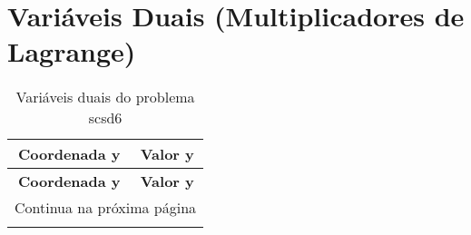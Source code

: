 \documentclass[12pt]{article}
\begin{document}
\section{Variáveis Duais (Multiplicadores de Lagrange)}

\begin{longtable}{@{}cc@{}}
\caption{Variáveis duais do problema scsd6} \\
\toprule
\textbf{Coordenada y} & \textbf{Valor y} \\
\midrule
\endfirsthead

\toprule
\textbf{Coordenada y} & \textbf{Valor y} \\
\midrule
\endhead

\midrule \multicolumn{2}{r}{{Continua na próxima página}} \\ \midrule
\endfoot


\end{longtable}
\end{document}
